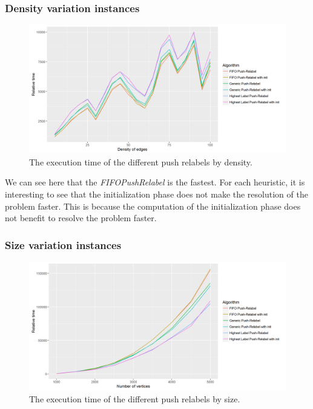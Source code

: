 \subsubsection{Density variation instances}
\begin{figure}[H]
\begin{center}
\includegraphics[scale=0.65]{images/meandensitypr.png}
\caption{The execution time of the different push relabels by density.}
\label{fig:mean_density_pr}
\end{center}
\end{figure}

We can see here that the \textit{FIFOPushRelabel} is the fastest. For each heuristic, it is interesting to see that the initialization phase does not make the resolution of the problem faster. This is because the computation of the initialization phase does not benefit to resolve the problem faster. 


\subsubsection{Size variation instances}
\begin{figure}[H]
\begin{center}
\includegraphics[scale=0.54]{images/meansizepr.png}
\caption{The execution time of the different push relabels by size.}
\label{fig:mean_size_pr}
\end{center}
\end{figure}

